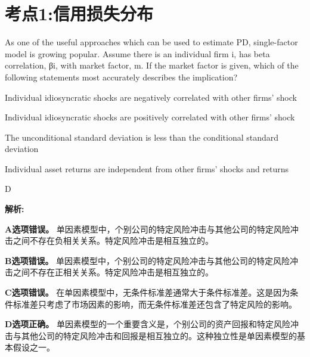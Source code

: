 \documentclass{article}
\newcounter{question} %
\newenvironment{explanation}
{\textbf{解析:}\par}
{\par}
\begin{document}
 \tableofcontents %
\newpage




\section{考点1:信用损失分布}
\setcounter{question}{0}

\begin{question}
    As one of the useful approaches which can be used to estimate PD, single-factor model is growing popular. Assume there is an individual firm i, has beta correlation, βi, with market factor, m. If the market factor is given, which of the following statements most accurately describes the implication?
\end{question}

\begin{choices}
    \item Individual idiosyncratic shocks are negatively correlated with other firms' shock
    \item Individual idiosyncratic shocks are positively correlated with other firms' shock
    \item The unconditional standard deviation is less than the conditional standard deviation
    \item Individual asset returns are independent from other firms' shocks and returns
\end{choices}

\begin{correctanswer}
    D
\end{correctanswer}

\begin{explanation}
    \textbf{A选项错误。}
    单因素模型中，个别公司的特定风险冲击与其他公司的特定风险冲击之间不存在负相关关系。特定风险冲击是相互独立的。

    \textbf{B选项错误。}
    单因素模型中，个别公司的特定风险冲击与其他公司的特定风险冲击之间不存在正相关关系。特定风险冲击是相互独立的。

    \textbf{C选项错误。}
    在单因素模型中，无条件标准差通常大于条件标准差。这是因为条件标准差只考虑了市场因素的影响，而无条件标准差还包含了特定风险的影响。

    \textbf{D选项正确。}
    单因素模型的一个重要含义是，个别公司的资产回报和特定风险冲击与其他公司的特定风险冲击和回报是相互独立的。这种独立性是单因素模型的基本假设之一。
\end{explanation}
\end{document}
